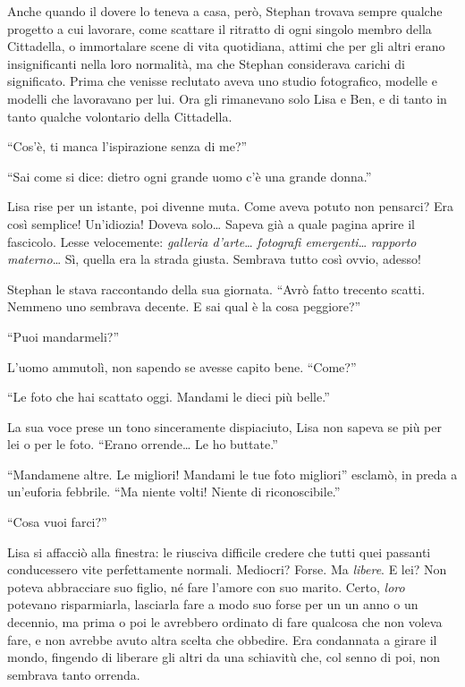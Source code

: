 

Anche quando il dovere lo teneva a casa, però, Stephan trovava sempre qualche progetto a cui
lavorare, come scattare il ritratto di ogni singolo membro della Cittadella, o immortalare scene di
vita quotidiana, attimi che per gli altri erano insignificanti nella loro normalità, ma che Stephan
considerava carichi di significato. Prima che venisse reclutato aveva uno studio fotografico,
modelle e modelli che lavoravano per lui. Ora gli rimanevano solo Lisa e Ben, e di tanto in tanto
qualche volontario della Cittadella.

``Cos'è, ti manca l'ispirazione senza di me?''

``Sai come si dice: dietro ogni grande uomo c'è una grande donna.''

Lisa rise per un istante, poi divenne muta. Come aveva potuto non pensarci? Era così semplice!
Un'idiozia! Doveva solo\dots{} Sapeva già a quale pagina aprire il fascicolo. Lesse velocemente:
\emph{galleria d'arte}\dots{} \emph{fotografi emergenti}\dots{} \emph{rapporto materno}\dots{} Sì,
quella era la strada giusta. Sembrava tutto così ovvio, adesso!

Stephan le stava raccontando della sua giornata. ``Avrò fatto trecento scatti. Nemmeno uno sembrava
decente. E sai qual è la cosa peggiore?''

``Puoi mandarmeli?''

L'uomo ammutolì, non sapendo se avesse capito bene. ``Come?''

``Le foto che hai scattato oggi. Mandami le dieci più belle.''

La sua voce prese un tono sinceramente dispiaciuto, Lisa non sapeva se più per lei o per le foto.
``Erano orrende\dots{} Le ho buttate.''

``Mandamene altre. Le migliori! Mandami le tue foto migliori'' esclamò, in preda a un'euforia
febbrile. ``Ma niente volti! Niente di riconoscibile.''

``Cosa vuoi farci?''

Lisa si affacciò alla finestra: le riusciva difficile credere che tutti quei passanti conducessero
vite perfettamente normali. Mediocri? Forse. Ma \emph{libere}. E lei? Non poteva abbracciare suo
figlio, né fare l'amore con suo marito. Certo, \emph{loro} potevano risparmiarla, lasciarla fare a
modo suo forse per un un anno o un decennio, ma prima o poi le avrebbero ordinato di fare qualcosa
che non voleva fare, e non avrebbe avuto altra scelta che obbedire. Era condannata a girare il
mondo, fingendo di liberare gli altri da una schiavitù che, col senno di poi, non sembrava tanto
orrenda.
